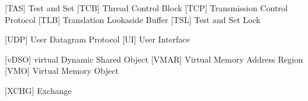 \begin{acronym} [POSIX]
 [TAS] {Test and Set}
 [TCB] {Thread Control Block}
 [TCP] {Transmission Control Protocol}
 [TLB] {Translation Lookaside Buffer}
 [TSL] {Test and Set Lock}

 [UDP] {User Datagram Protocol} 
  [UI]  {User Interface}

 [vDSO] {virtual Dynamic Shared Object}
 [VMAR] {Virtual Memory Address Region}
  [VMO]  {Virtual Memory Object}


 [XCHG] {Exchange}



\end{acronym} 
